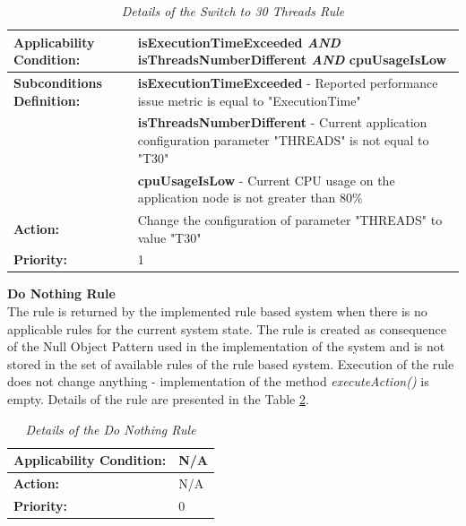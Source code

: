 \documentclass[12pt,a4paper]{article}
\begin{document}
\begin{table}[!htb]
\begin{center}
\begin{tabularx}{\textwidth}{l|X}
\textbf{Applicability Condition:} & \textbf{isExecutionTimeExceeded} \textit{AND} \newline
\textbf{isThreadsNumberDifferent} \textit{AND} \newline
\textbf{cpuUsageIsLow} \\ \hline

\textbf{Subconditions Definition:} & \textbf{isExecutionTimeExceeded} -  Reported performance issue metric is equal to "ExecutionTime"  \\
& \textbf{isThreadsNumberDifferent} -  Current application configuration parameter "THREADS" is not equal to "T30" \\
& \textbf{cpuUsageIsLow} - Current CPU usage on the application node is not greater than 80\% \\ \hline

\textbf{Action:} & Change the configuration of parameter "THREADS" to value "T30" \\ \hline
\textbf{Priority:} & 1\\
\end{tabularx}
\end{center}
\caption{\textit{Details of the Switch to 30 Threads Rule}} \label{rules30}
\end{table}

\vspace{10mm}
\noindent\textbf{Do Nothing Rule} \\
The rule is returned by the implemented rule based system when there is no applicable rules for the current system state.  The rule is created as consequence of the Null Object Pattern \cite{nop} used in the implementation of the system and is not stored in the set of available rules of the rule based system. Execution of the rule does not change anything - implementation of the method \textit{executeAction()} is empty. Details of the rule are presented in the Table \ref{ruledonothing}.

\begin{table}[!htb]
\begin{center}
\begin{tabularx}{\textwidth}{l|X}
\textbf{Applicability Condition:} & N/A \\ \hline
\textbf{Action:} & N/A \\ \hline
\textbf{Priority:} & 0\\
\end{tabularx}
\end{center}
\caption{\textit{Details of the Do Nothing Rule}} \label{ruledonothing}
\end{table}
\end{document}
